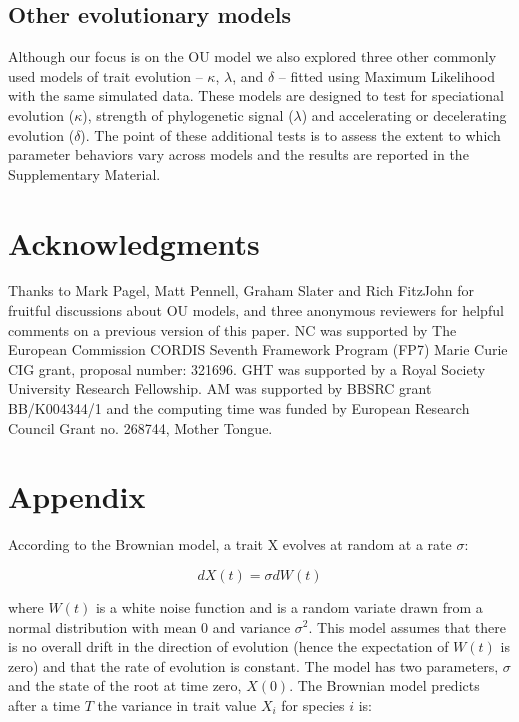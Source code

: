 \documentclass[a4paper,12pt]{article}
\begin{document}
  \subsection{Other evolutionary models}
    Although our focus is on the OU model we also explored three other commonly used models of trait evolution -- $\kappa$, $\lambda$, and $\delta$ \citep{Pagel:1997aa,Pagel:1999aa} -- fitted using Maximum Likelihood with the same simulated data. 
    These models are designed to test for speciational evolution ($\kappa$), strength of phylogenetic signal ($\lambda$) and accelerating or decelerating evolution ($\delta$). 
    The point of these additional tests is to assess the extent to which parameter behaviors vary across models and the results are reported in the Supplementary Material. 



\section{Acknowledgments}
Thanks to Mark Pagel, Matt Pennell, Graham Slater and Rich FitzJohn for fruitful discussions about OU models, and three anonymous reviewers for helpful comments on a previous version of this paper. NC was supported by The European Commission CORDIS Seventh Framework Program (FP7) Marie Curie CIG grant, proposal number: 321696. GHT was supported by a Royal Society University Research Fellowship. AM was supported by BBSRC grant BB/K004344/1 and the computing time was funded by European Research Council Grant no. 268744, Mother Tongue.




\section{Appendix}
  \label{section:models}
  \setcounter{equation}{0}

  According to the Brownian model, a trait X evolves at random at a rate $\sigma$:

    \begin{equation}
      dX(t) = \sigma dW(t)
      \label{equation:BMrate} 
    \end{equation}

  where $W(t)$ is a white noise function and is a random variate drawn from a normal distribution with mean $0$ and variance $\sigma^2$. 
  This model assumes that there is no overall drift in the direction of evolution (hence the expectation of $W(t)$ is zero) and that the rate of evolution is constant. 
  The model has two parameters, $\sigma$ and the state of the root at time zero, $X(0)$. 
  The Brownian model predicts after a time $T$ the variance in trait value $X_i$ for species $i$ is:
\end{document}
